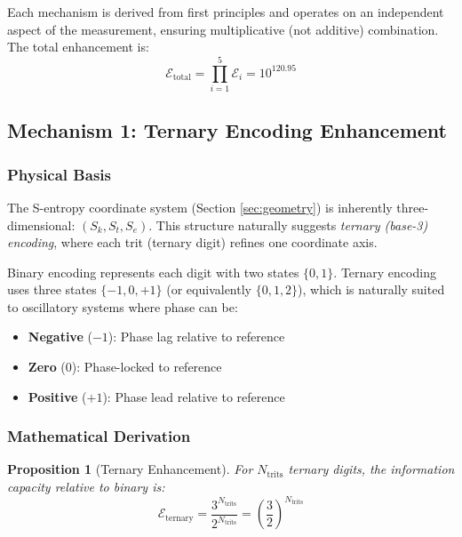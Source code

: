 \documentclass[twocolumn,10pt]{article}
\newtheorem{proposition}[theorem]{Proposition}
\theoremstyle{remark}
\begin{document}
Each mechanism is derived from first principles and operates on an independent aspect of the measurement, ensuring multiplicative (not additive) combination. The total enhancement is:
\begin{equation}
    \mathcal{E}_{\text{total}} = \prod_{i=1}^{5} \mathcal{E}_i = 10^{120.95}
    \label{eq:total_enhancement_preview}
\end{equation}

\subsection{Mechanism 1: Ternary Encoding Enhancement}

\subsubsection{Physical Basis}

The S-entropy coordinate system (Section \ref{sec:geometry}) is inherently three-dimensional: $(S_k, S_t, S_e)$. This structure naturally suggests \textit{ternary (base-3) encoding}, where each trit (ternary digit) refines one coordinate axis.

Binary encoding represents each digit with two states $\{0, 1\}$. Ternary encoding uses three states $\{-1, 0, +1\}$ (or equivalently $\{0, 1, 2\}$), which is naturally suited to oscillatory systems where phase can be:
\begin{itemize}
    \item \textbf{Negative} ($-1$): Phase lag relative to reference
    \item \textbf{Zero} ($0$): Phase-locked to reference
    \item \textbf{Positive} ($+1$): Phase lead relative to reference
\end{itemize}

\subsubsection{Mathematical Derivation}

\begin{proposition}[Ternary Enhancement]
\label{prop:ternary_enhancement}
For $N_{\text{trits}}$ ternary digits, the information capacity relative to binary is:
\begin{equation}
    \mathcal{E}_{\text{ternary}} = \frac{3^{N_{\text{trits}}}}{2^{N_{\text{trits}}}} = \left(\frac{3}{2}\right)^{N_{\text{trits}}}
    \label{eq:ternary_enhancement}
\end{equation}
\end{proposition}
\end{document}
